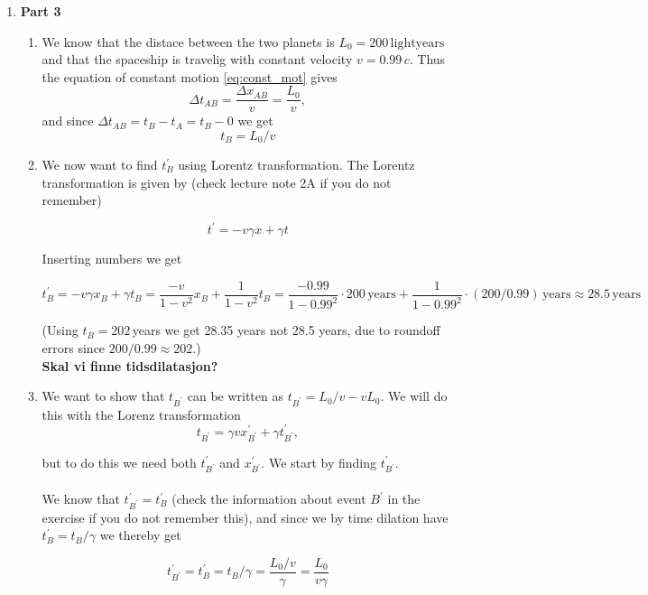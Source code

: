 \documentclass[a4paper,10pt,english]{article}
\begin{document}
\begin{enumerate}
\begin{enumerate}
\end{enumerate}

\item \textbf{Part 3}

\begin{enumerate}

\item We know that the distace between the two planets is $L_{0}=200\,\text{lightyears}$ and that the spaceship is travelig with constant velocity $v=0.99\,c$. Thus the equation of constant motion \ref{eq:const_mot} gives \[\Delta t_{AB}=\frac{\Delta x_{AB}}{v}=\frac{L_{0}}{v},\] and since $\Delta t_{AB}=t_{B}-t_{A}=t_{B}-0$ we get \[t_{B}=L_{0}/v\]


\item We now want to find $t^{\prime}_{B}$ using Lorentz transformation. The Lorentz transformation is given by (check lecture note 2A if you do not remember)

\[t^{\prime}=-v\gamma x+\gamma t\]

Inserting numbers we get

\[t_{B}^{\prime}=-v\gamma x_{B}+\gamma t_{B}=\frac{-v}{1-v^{2}}x_{B}+\frac{1}{1-v^{2}}t_{B}=\frac{-0.99}{1-0.99^{2}}\cdot200\,\text{years}+\frac{1}{1-0.99^{2}}\cdot(200/0.99)\,\text{years}\approx28.5\,\text{years}\]

(Using $t_{B}=202\,$years we get 28.35 years not 28.5 years, due to roundoff errors since $200/0.99\approx 202$.)
\\
\textbf{Skal vi finne tidsdilatasjon?}

\item We want to show that $t_{B^{\prime}}$ can be written as $t_{B^{\prime}}=L_{0}/v-vL_{0}$. We will do this with the Lorenz transformation \[t_{B^{\prime}}=\gamma vx^{\prime}_{B^{\prime}}+\gamma t^{\prime}_{B^{\prime}},\]

but to do this we need both $t^{\prime}_{B^{\prime}}$ and $x^{\prime}_{B^{\prime}}$. We start by finding $t^{\prime}_{B^{\prime}}$.
\\ \\
We know that $t^{\prime}_{B^{\prime}}=t^{\prime}_{B}$ (check the information about event $B^{\prime}$ in the exercise if you do not remember this), and since we by time dilation have $t^{\prime}_{B}=t_{B}/\gamma$ we thereby get

\begin{equation}\label{eq:t_mark_B_mark}
t^{\prime}_{B^{\prime}}=t^{\prime}_{B}=t_{B}/\gamma=\frac{L_{0}/v}{\gamma}=\frac{L_{0}}{v\gamma}
\end{equation}


\end{enumerate}
\end{enumerate}
\end{document}
